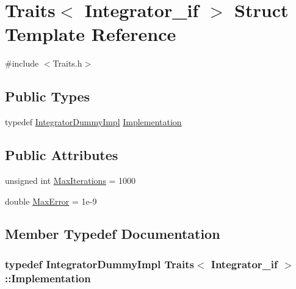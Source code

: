 \hypertarget{struct_traits_3_01_integrator__if_01_4}{}\section{Traits$<$ Integrator\+\_\+if $>$ Struct Template Reference}
\label{struct_traits_3_01_integrator__if_01_4}


{\ttfamily \#include $<$Traits.\+h$>$}

\subsection*{Public Types}
\begin{DoxyCompactItemize}
\item 
typedef \hyperlink{class_integrator_dummy_impl}{Integrator\+Dummy\+Impl} \hyperlink{struct_traits_3_01_integrator__if_01_4_a216bff3a8e96bbf97d8f73a8fb0e4df4}{Implementation}
\end{DoxyCompactItemize}
\subsection*{Public Attributes}
\begin{DoxyCompactItemize}
\item 
unsigned int \hyperlink{struct_traits_3_01_integrator__if_01_4_a00ccc8b3ca58fdd91a0b40c59a02879b}{Max\+Iterations} = 1000
\item 
double \hyperlink{struct_traits_3_01_integrator__if_01_4_a32e086683b5e71dd7be4225d717d22a2}{Max\+Error} = 1e-\/9
\end{DoxyCompactItemize}


\subsection{Member Typedef Documentation}
\subsubsection[{\texorpdfstring{Implementation}{Implementation}}]{\setlength{\rightskip}{0pt plus 5cm}typedef {\bf Integrator\+Dummy\+Impl} {\bf Traits}$<$ {\bf Integrator\+\_\+if} $>$\+::{\bf Implementation}}\hypertarget{struct_traits_3_01_integrator__if_01_4_a216bff3a8e96bbf97d8f73a8fb0e4df4}{}\label{struct_traits_3_01_integrator__if_01_4_a216bff3a8e96bbf97d8f73a8fb0e4df4}


